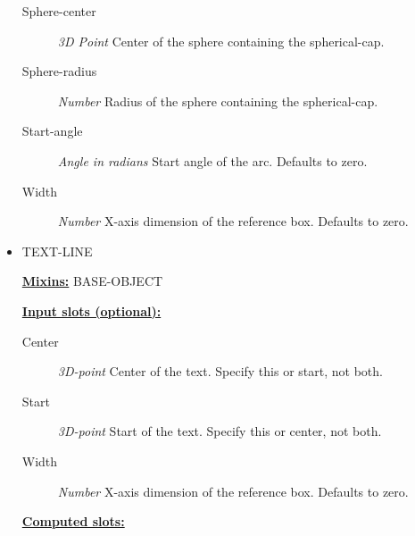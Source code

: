 \documentclass [11pt]{book}
\begin{document}
\begin{itemize}
\begin{description}
\item [Sphere-center]
\emph{3D Point} Center of the sphere containing the spherical-cap.


\item [Sphere-radius]
\emph{Number} Radius of the sphere containing the spherical-cap.


\item [Start-angle]
\emph{Angle in radians} Start angle of the arc. Defaults to zero.


\item [Width]
\emph{Number} X-axis dimension of the reference box. Defaults to zero.


\end{description}







\item {}TEXT-LINE


\textbf{
\underline{Mixins:}} BASE-OBJECT





\begin{description}

\end{description}








\textbf{
\underline{Input slots (optional):}}

\begin{description}

\item [Center]
\emph{3D-point} Center of the text. Specify this or start, not both.


\item [Start]
\emph{3D-point} Start of the text. Specify this or center, not both.


\item [Width]
\emph{Number} X-axis dimension of the reference box. Defaults to zero.


\end{description}






\textbf{
\underline{Computed slots:}}


\end{itemize}
\end{document}

